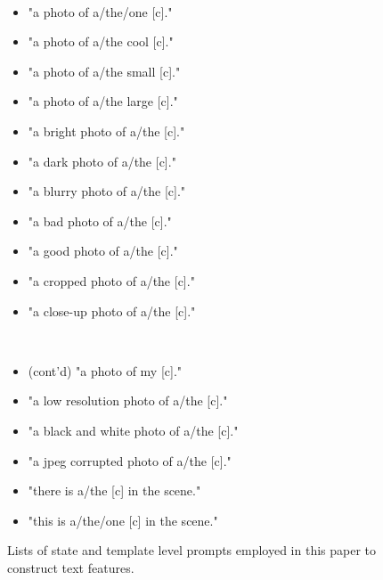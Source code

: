 \begin{figure}
\begin{minipage}[t]{0.38\linewidth}
{\tt \small
\begin{itemize}
\item "a photo of a/the/one [c]."
\item "a photo of a/the cool [c]."
\item "a photo of a/the small [c]."
\item "a photo of a/the large [c]."
\item "a bright photo of a/the [c]." 
\item "a dark photo of a/the [c]."
\item "a blurry photo of a/the [c]."
\item "a bad photo of a/the [c]."
\item "a good photo of a/the [c]."
\item "a cropped photo of a/the [c]."
\item "a close-up photo of a/the [c]."
\end{itemize}
}
\end{minipage}
\begin{minipage}[t]{0.29\linewidth}
{\tt \small
\begin{itemize}
\item {\rm (cont'd)} "a photo of my [c]."
\item "a low resolution photo of a/the [c]."
\item "a black and white photo of a/the [c]."
\item "a jpeg corrupted photo of a/the [c]."
\item "there is a/the [c] in the scene."
\item "this is a/the/one [c] in the scene."
\end{itemize}
}
\end{minipage}
\caption{Lists of state and template level prompts employed in this paper to construct text features.}
\label{fig:comp_prompt}
\vspace{10pt}
\end{figure}

